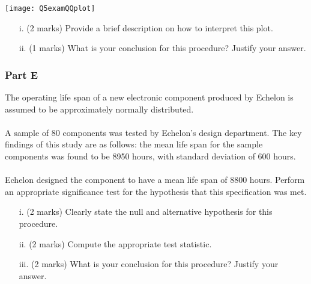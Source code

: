 \documentclass[a4paper,12pt]{article}
\begin{document}
\begin{center}
\texttt{[image: Q5examQQplot]}
\end{center}

\begin{itemize}
\item[i.] (2 marks) Provide a brief description on how to interpret this plot.
\item[ii.] (1 marks) What is your conclusion for this procedure? Justify your answer.
\end{itemize}

\subsubsection*{Part E} %
The operating life span of a new electronic component produced by Echelon is assumed to be approximately normally distributed.\\\\
    A sample of 80 components was tested by Echelon's design department. The key findings of this study are as follows: the mean life span for the sample components was found to be 8950 hours, with standard deviation of 600 hours.\\\\ Echelon designed the component to have a mean life span of 8800 hours. Perform an appropriate significance test for the hypothesis that this specification was met.


\begin{itemize}
\item[i.] (2 marks) Clearly state the null and alternative hypothesis for this procedure.
\item[ii.] (2 marks) Compute the appropriate test statistic.
\item[iii.] (2 marks) What is your conclusion for this procedure? Justify your answer.
\end{itemize}



\bigskip

%
\end{document}
